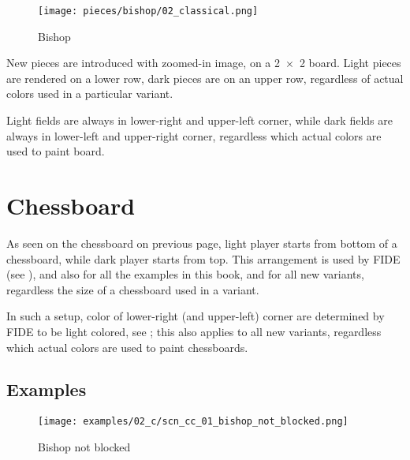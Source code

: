 \noindent
\begin{wrapfigure}[12]{l}{0.4\textwidth}
\centering
\texttt{[image: pieces/bishop/02\_classical.png]}
\caption{Bishop}
\label{fig:bishop/02_classical}
\end{wrapfigure}
New pieces are introduced with zoomed-in image, on a \mbox{2 $\times$ 2} board.
Light pieces are rendered on a lower row, dark pieces are on an upper row,
regardless of actual colors used in a particular variant. %

Light fields are always in lower-right and upper-left corner, while dark fields
are always in lower-left and upper-right corner, regardless which actual colors
are used to paint board.


\section*{Chessboard}
\label{sec:Classical Chess/Chessboard}

As seen on the chessboard on previous page, light player starts from bottom of
a chessboard, while dark player starts from top. This arrangement is used by FIDE
(see ), and also for all the examples in this book, and for all
new variants, regardless the size of a chessboard used in a variant.

In such a setup, color of lower-right (and upper-left) corner are determined by
FIDE to be light colored, see ; this also applies to all new
variants, regardless which actual colors are used to paint chessboards.

\clearpage %

\subsection*{Examples}
\label{sec:Classical Chess/Chessboard/Examples}

\vspace*{-0.7\baselineskip}
\noindent
\begin{figure}[!h]
\texttt{[image: examples/02\_c/scn\_cc\_01\_bishop\_not\_blocked.png]}
\caption{Bishop not blocked}
\label{fig:scn_cc_01_bishop_not_blocked}
\end{figure}

